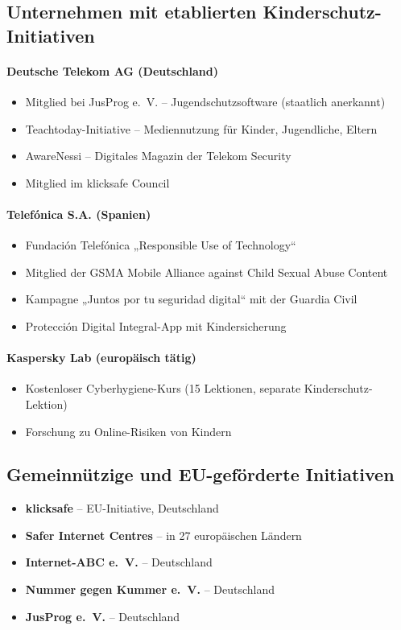 \documentclass[11pt,a4paper]{article}
\begin{document}
	\subsection{Unternehmen mit etablierten Kinderschutz-Initiativen}
	
	\paragraph{Deutsche Telekom AG (Deutschland)}
	\begin{itemize}
		\item Mitglied bei JusProg e.~V. -- Jugendschutzsoftware (staatlich anerkannt) \cite{telekom}
		\item Teachtoday-Initiative -- Mediennutzung für Kinder, Jugendliche, Eltern
		\item AwareNessi -- Digitales Magazin der Telekom Security
		\item Mitglied im klicksafe Council
	\end{itemize}
	
	\paragraph{Telefónica S.A. (Spanien)}
	\begin{itemize}
		\item Fundación Telefónica „Responsible Use of Technology“ \cite{telefonica}
		\item Mitglied der GSMA Mobile Alliance against Child Sexual Abuse Content
		\item Kampagne „Juntos por tu seguridad digital“ mit der Guardia Civil
		\item Protección Digital Integral-App mit Kindersicherung
	\end{itemize}
	
	\paragraph{Kaspersky Lab (europäisch tätig)}
	\begin{itemize}
		\item Kostenloser Cyberhygiene-Kurs (15 Lektionen, separate Kinderschutz-Lektion) \cite{kaspersky2025}
		\item Forschung zu Online-Risiken von Kindern
	\end{itemize}
	
	\subsection{Gemeinnützige und EU-geförderte Initiativen}
	\begin{itemize}
		\item \textbf{klicksafe} -- EU-Initiative, Deutschland \cite{klicksafe}
		\item \textbf{Safer Internet Centres} -- in 27 europäischen Ländern \cite{sid2025}
		\item \textbf{Internet-ABC e.~V.} -- Deutschland \cite{internetabc}
		\item \textbf{Nummer gegen Kummer e.~V.} -- Deutschland
		\item \textbf{JusProg e.~V.} -- Deutschland \cite{telekom}
	\end{itemize}
	
\end{document}
